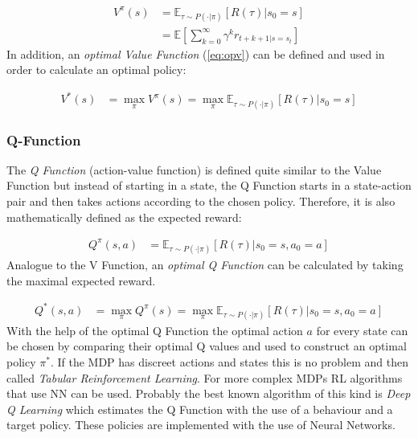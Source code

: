 \begin{align}
	V^{\pi}(s) &= \mathbb{E}_{\tau \sim P(\cdot|\pi)}[R(\tau)|s_0=s] \\
	&= \mathbb{E}[\sum_{k=0}^{\infty}\gamma^k r_{t+k+1|s=s_t}]
\end{align}
\newline
In addition, an \emph{optimal Value Function} (\cref{eq:opv}) can be defined and used in order to calculate an optimal policy:

\begin{align}\label{eq:opv}
	V^*(s) &= \max_{\pi} V^{\pi}(s)
	= \max_{\pi} \mathbb{E}_{\tau \sim P(\cdot|\pi)}[R(\tau)|s_0=s]
\end{align} 

\subsubsection{Q-Function} \label{sec:Q}
The \emph{Q Function} (action-value function) is defined quite similar to the Value Function but instead of starting in a state, 
the Q Function starts in a state-action pair and then takes actions according to the chosen policy. Therefore, it is also mathematically defined as the expected reward:

\begin{align}
	Q^{\pi}(s,a) &= \mathbb{E}_{\tau \sim P(\cdot|\pi)}[R(\tau)|s_0=s, a_0=a]
\end{align}
\newline
Analogue to the V Function, an \emph{optimal Q Function} can be calculated by taking the maximal expected reward.

\begin{align} \label{eq:opq}
	Q^*(s,a) &= \max_{\pi} Q^{\pi}(s)
	= \max_{\pi} \mathbb{E}_{\tau \sim P(\cdot|\pi)}[R(\tau)|s_0=s, a_0=a]
\end{align}
\newline
With the help of the optimal Q Function the optimal action $a$ for every state can be chosen by comparing 
their optimal Q values and used to construct an optimal policy $\pi^*$. 
If the MDP has discreet actions and states this is no problem and then called \emph{Tabular Reinforcement Learning}. 
For more complex  MDPs RL algorithms that use NN can be used. Probably the best known algorithm of this kind is 
\emph{Deep Q Learning} \cite{pmlr-v120-yang20a} which estimates the Q Function with the use of a behaviour and a target policy. 
These policies are implemented with the use of Neural Networks.

